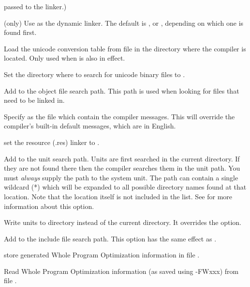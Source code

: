 \begin{description}
passed to the linker.)
\item[-FLxxx] (\linux only) Use  as the dynamic linker. The default is , or
, depending on which one is found first.
\item[-Fmxxx] Load the unicode conversion table from file  in
the directory where the compiler is located. Only used when  is
also in effect.
\item[-FMxxx]  Set the directory where to search for unicode binary files to .
\item[-Foxxx] Add  to the object file search path.
This path is used when looking for files that need to be linked in.
\item [-Frxxx] Specify  as the file which contain the compiler
messages. This will override the compiler's built-in default messages, which
are in English.
\item[-FRxxx] set the resource (.res) linker to .
\item [-Fuxxx] Add  to the unit search path.
Units are first searched in the current directory.
If they are not found there then the compiler searches them in the unit path.
You must {\em always} supply the path to the system unit. The 
path can contain a single wildcard (*) which will be expanded to all
possible directory names found at that location. Note that the location
itself is not included in the list. See  for more
information about this option.
\item [-FUxxx] Write units to directory  instead of the current
directory. It overrides the  option.
\item [-Ixxx]  Add  to the include file search path.
This option has the same effect as .
\item[-FWxxx] store generated Whole Program Optimization information in file
.
\item[-Fwxxx] Read Whole Program Optimization information (as saved using -FWxxx) from file
.
\end{description}

